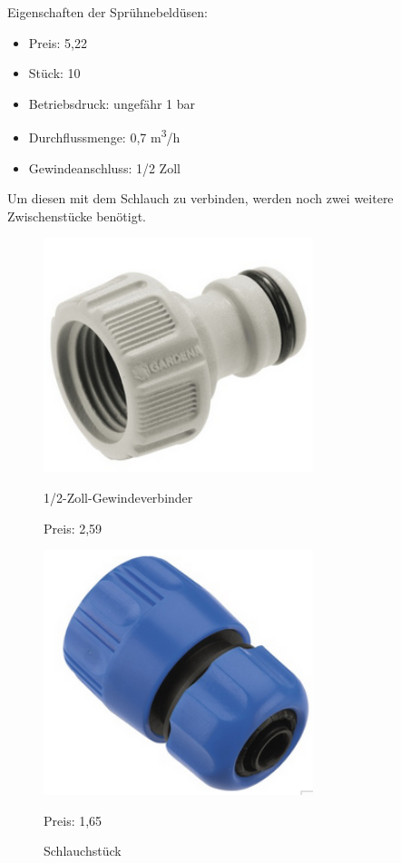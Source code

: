 \newpage

Eigenschaften der Sprühnebeldüsen:

\begin{itemize}
	\item{Preis: 5,22\textsf{\texteuro} \cite{preisSprueher}}
	\item{Stück: 10}
	\item{Betriebsdruck: ungefähr 1 bar}
	\item{Durchflussmenge: 0,7 m\textsuperscript{3}/h}
	\item{Gewindeanschluss: 1/2 Zoll}
\end{itemize}

Um diesen mit dem Schlauch zu verbinden, werden noch zwei weitere Zwischenstücke benötigt.

\begin{figure}[H]
\begin{minipage}[t]{0.45\textwidth}
\includegraphics[width=0.7\textwidth]{fig/GardenaHahnverbinder}
\caption{1/2-Zoll-Gewindeverbinder}
Preis: 2,59 \textsf{\texteuro} \cite{preisGewindeverbinder}
\end{minipage}
\hspace{0.1\textwidth}
\begin{minipage}[t]{0.45\textwidth}
\includegraphics[width=0.7\textwidth]{fig/Schlauchstueck}
\caption{Schlauchstück}
Preis: 1,65\textsf{\texteuro} \cite{preisSchlauchstueck}
\end{minipage}
\end{figure}

